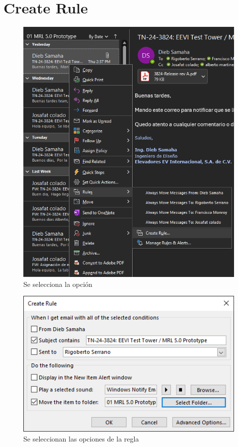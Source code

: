 \documentclass[12pt,letterpaper,final]{report}
\begin{document}
\section{Create Rule}


\begin{figure}[H]
	\centering
	\includegraphics[width=0.75\linewidth, height=0.35\textheight,keepaspectratio]{Imagenes/outlook_rules03}
	\caption{Se selecciona la opción}
	\label{fig:outlookrules03}
\end{figure}

\begin{figure}[H]
	\centering
	\includegraphics[width=0.75\linewidth, height=0.35\textheight,keepaspectratio]{Imagenes/outlook_rules04}
	\caption{Se seleccionan las opciones de la regla}
	\label{fig:outlookrules04}
\end{figure}
\end{document}
